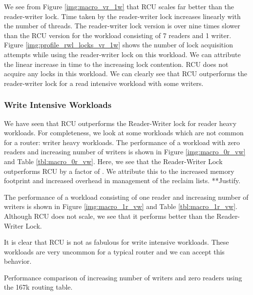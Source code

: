 \documentclass[12pt,a4paper]{article}
\begin{document}
We see from Figure \ref{img:macro_vr_1w} that RCU scales far better
than the reader-writer lock. Time taken by the reader-writer lock
increases linearly with the number of threads. The reader-writer lock
version is over nine times slower than the RCU version for the
workload consisting of 7 readers and 1 writer. Figure \ref{img:profile_rwl_locks_vr_1w} shows the number of lock acquisition attempts while using the reader-writer lock on this workload. We can attribute the linear increase in time to the increasing lock contention. RCU does not acquire any locks in this workload. We can clearly see that RCU
outperforms the reader-writer lock for a read intensive workload with some writers.

\subsubsection{Write Intensive Workloads}
We have seen that RCU outperforms the Reader-Writer lock for reader heavy workloads. For completeness, we look at some workloads which are not common for a router: writer heavy workloads. The performance of a workload with zero readers and increasing number of writers is shown in  Figure \ref{img:macro_0r_vw} and Table \ref{tbl:macro_0r_vw}. Here, we see that the Reader-Writer Lock outperforms RCU by a factor of . We attribute this to the increased memory footprint and increased overhead in management of the reclaim lists. **Justify.

The performance of a workload consisting of one reader and increasing number of writers is shown in  Figure \ref{img:macro_1r_vw} and Table \ref{tbl:macro_1r_vw}. Although RCU does not scale, we see that it performs better than the Reader-Writer Lock.

It is clear that RCU is not as fabulous for write intensive workloads. These workloads are very uncommon for a typical router and we can accept this behavior.
 
\begin{table}[tph]
\begin{center}

\end{center}
\caption{Performance comparison of increasing number of writers and zero readers using the 167k routing table.}
\label{tbl:macro_0r_vw}
\end{table}
\end{document}
